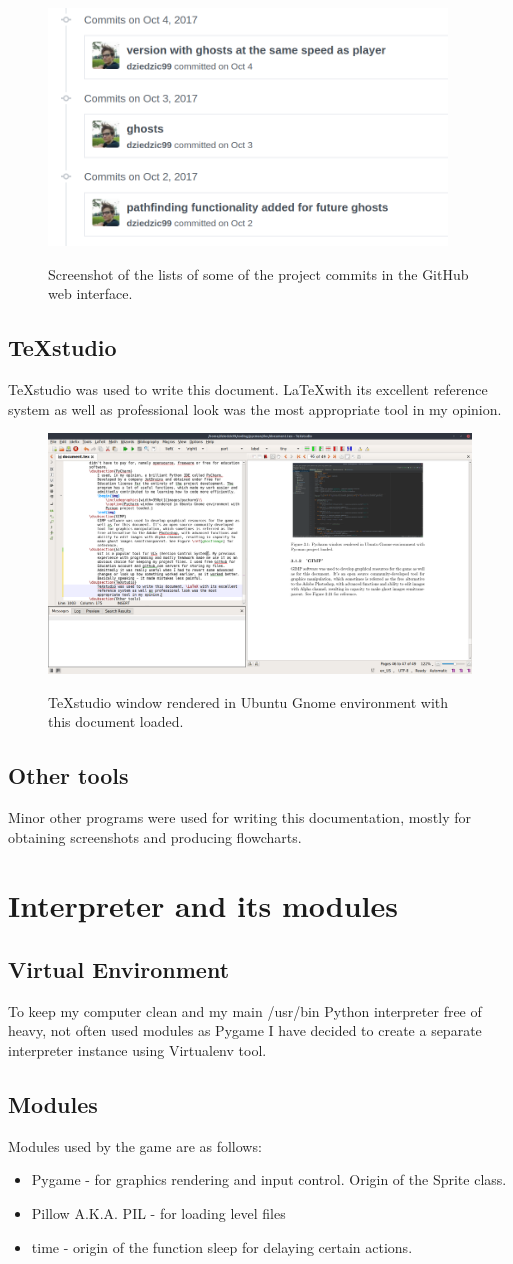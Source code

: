 \documentclass[11pt,a4paper]{report}
\newcommand{\dsubsection}[1]{\FloatBarrier \subsection{#1}}
\newenvironment{img}{
	\begin{center}
		\begin{figure}[H]
			\begin{center}
			
}{
	\end{center}
		\end{figure}
			\end{center}
}
\begin{document}
				\begin{img}
					\includegraphics[width=300pt]{images/github.png}\\
					\caption{Screenshot of the lists of some of the project commits in the GitHub web interface.}
				\end{img}
			\dsubsection{TeXstudio}
				TeXstudio was used to write this document. \LaTeX with its excellent reference system as well as professional look was the most appropriate tool in my opinion.
				\begin{img}
					\includegraphics[width=350pt]{images/texstudio}\\
					\caption{TeXstudio window rendered in Ubuntu Gnome environment with this document loaded.}
				\end{img}
			\dsubsection{Other tools}
				Minor other programs were used for writing this documentation, mostly for obtaining screenshots and producing flowcharts.
		\section{Interpreter and its modules}
			\dsubsection{Virtual Environment}
				To keep my computer clean and my main /usr/bin Python interpreter free of heavy, not often used modules as Pygame I have decided to create a separate interpreter instance using Virtualenv tool.
			\dsubsection{Modules}
				Modules used by the game are as follows:
				\begin{itemize}
					\item Pygame - for graphics rendering and input control. Origin of the Sprite class.
					\item Pillow A.K.A. PIL - for loading level files
					\item time - origin of the function sleep for delaying certain actions.
				\end{itemize}
\end{document}
